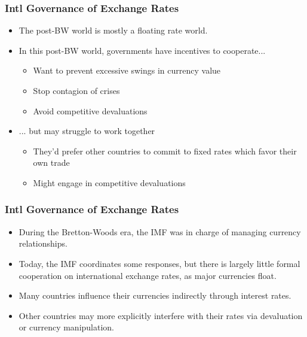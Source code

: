 \documentclass{beamer}
\begin{document}
\begin{frame} 
	\frametitle{\LARGE{Intl Governance of Exchange Rates}}
	\begin{itemize}
			\item The post-BW world is mostly a floating rate world.
			\item In this post-BW world, governments have incentives to cooperate... \pause
			\begin{itemize}
				\item Want to prevent excessive swings in currency value \pause 
				\item Stop contagion of crises \pause 
				\item Avoid competitive devaluations  \pause
			\end{itemize}
			\item ... but may struggle to work together \pause
			\begin{itemize}
				\item They'd prefer other countries to commit to fixed rates which favor their own trade \pause 
				\item Might engage in competitive devaluations  
			\end{itemize}
		
	\end{itemize}
\end{frame}

\begin{frame} 
	\frametitle{\LARGE{Intl Governance of Exchange Rates}}
	\begin{itemize}
		\item During the Bretton-Woods era, the IMF was in charge of managing currency relationships. \pause
		\item Today, the IMF coordinates some responses, but there is largely little formal cooperation on international exchange rates, as  major currencies float. \pause 
		\item Many countries influence their currencies indirectly through interest rates. \pause 
		\item Other countries may more explicitly interfere with their rates via devaluation or currency manipulation.		
	\end{itemize}
\end{frame}
\end{document}
